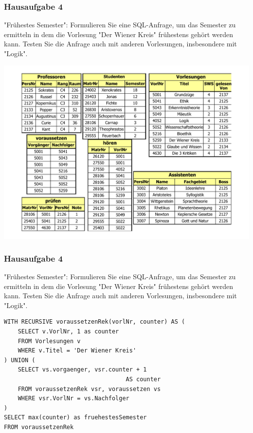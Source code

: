 \begin{frame}[fragile]
\frametitle{Hausaufgabe 4}
\vspace{0.25cm}

\begin{multicols}{2}
	"Frühestes Semester": Formulieren Sie eine SQL-Anfrage, 
	um das Semester zu ermitteln in dem die Vorlesung "Der Wiener Kreis" frühestens gehört 
	werden kann. Testen Sie die Anfrage auch mit anderen Vorlesungen, 
	insbesondere mit "Logik".
	\vfill\columnbreak
	
	\begin{center}
		\includegraphics[height=.6\paperheight]{../img/uni.pdf}
	\end{center}
\end{multicols}
\end{frame}

\begin{frame}[fragile]
\frametitle{Hausaufgabe 4}
\vspace{0.25cm}

\begin{multicols}{2}
	"Frühestes Semester": Formulieren Sie eine SQL-Anfrage, 
	um das Semester zu ermitteln in dem die Vorlesung "Der Wiener Kreis" frühestens gehört 
	werden kann. Testen Sie die Anfrage auch mit anderen Vorlesungen, 
	insbesondere mit "Logik".
	\vfill\columnbreak

	\begin{verbatim}
WITH RECURSIVE voraussetzenRek(vorlNr, counter) AS (
	SELECT v.VorlNr, 1 as counter
	FROM Vorlesungen v
	WHERE v.Titel = 'Der Wiener Kreis'
) UNION (
	SELECT vs.vorgaenger, vsr.counter + 1 
	                               AS counter
	FROM voraussetzenRek vsr, voraussetzen vs
	WHERE vsr.VorlNr = vs.Nachfolger
)
SELECT max(counter) as fruehestesSemester
FROM voraussetzenRek
	\end{verbatim}
\end{multicols}
\end{frame}
